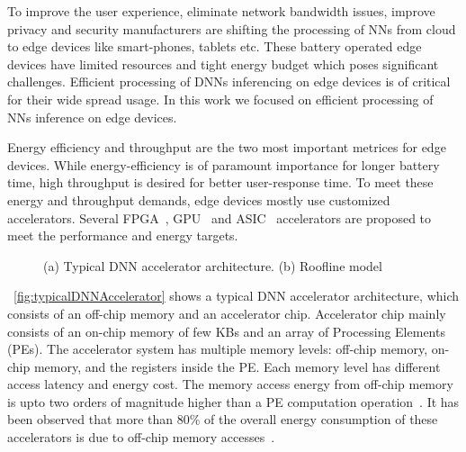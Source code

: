 \documentclass[a4paper,10pt]{article}
\begin{document}
To improve the user experience, eliminate network bandwidth issues, improve privacy and security manufacturers are shifting the processing of NNs from cloud to edge devices like smart-phones, tablets etc. These battery operated edge devices have limited resources and tight energy budget which poses significant challenges. Efficient processing of DNNs inferencing on edge devices is of critical for their wide spread usage. In this work we focused on efficient processing of NNs inference on edge devices. 

Energy efficiency and throughput are the two most important metrices for edge devices. While energy-efficiency is of paramount importance for longer battery time, high throughput is desired for better user-response time. To meet these energy and throughput demands, edge devices mostly use customized accelerators. Several FPGA~\cite{zhang2015optimizing,wei2019overcoming,gokhale2014240,8742284,gupta2015deep,alwani2016fused}, GPU~\cite{chetlur2014cudnn} and ASIC~\cite{Chen2016EyerissAS,chen2014diannao,chen2014dadiannao,du2015shidiannao} accelerators are proposed to meet the performance and energy targets. 
\begin{figure}[!htb]
	\centering
	\hfil
	\caption{(a) Typical DNN accelerator architecture. (b) Roofline model}
	\label{fig:acceleratorAndRoofline}
	\vspace{-1.0em}	
\end{figure}

\figurename{~\ref{fig:typicalDNNAccelerator}} shows a typical DNN accelerator architecture, which consists of an off-chip memory and an accelerator chip. Accelerator chip mainly consists of an on-chip memory of few KBs and an array of Processing Elements (PEs). The accelerator system has multiple memory levels: off-chip memory, on-chip memory, and the registers inside the PE. Each memory level has different access latency and energy cost. The memory access energy from off-chip memory is upto two orders of magnitude higher than a PE computation operation~\cite{Chen2016EyerissAS}. It has been observed that more than 80\% of the overall energy consumption of these accelerators is due to off-chip memory accesses~\cite{chen2014diannao}. 
\end{document}
